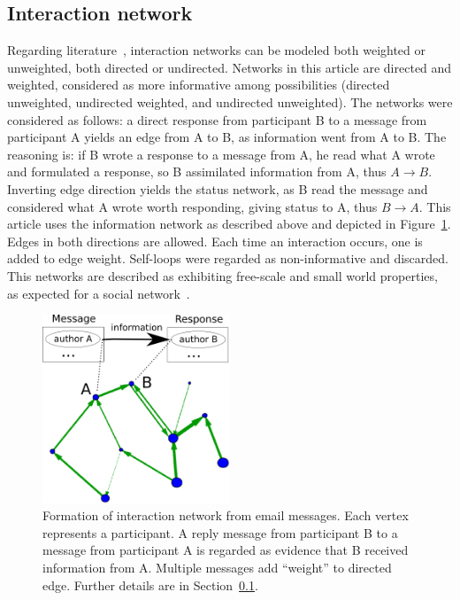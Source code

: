 \documentclass[%
 aip,
 jmp,%
 amsmath,amssymb,
 reprint,%
]{revtex4-1}
\begin{document}
    \subsection{Interaction network}\label{intNet}
Regarding literature~\cite{bird,newmanCommunityDirected,newmanCommunity2013}, interaction networks can be modeled both weighted or unweighted, both directed or undirected. Networks in this article are directed and weighted, considered as more informative among possibilities (directed unweighted, undirected weighted, and undirected unweighted).
The networks were considered as follows: a direct response from participant B to a message from participant A yields an edge from A to B, as information went from A to B. The reasoning is: if B wrote a response to a message from A, he read what A wrote and formulated a response, so B assimilated information from A, thus $A \rightarrow B$. Inverting edge direction yields the status network, as B read the message and considered what A wrote worth responding, giving status to A, thus $B\rightarrow A$. This article uses the information network as described above and depicted in Figure~\ref{formationNetwork}. Edges in both directions are allowed. Each time an interaction occurs, one is added to edge weight. Self-loops were regarded as non-informative and discarded. This networks are described as exhibiting free-scale and small world properties, as expected for a social network~\cite{bird}.

\begin{figure}[hb]
    \centering
    \includegraphics[width=0.5\textwidth]{figs/criaRede_}
    \caption{Formation of interaction network from email messages. Each vertex represents a participant. A reply message from participant B to a message from participant A is regarded as evidence that B received information from A. Multiple messages add ``weight'' to directed edge. Further details are in Section~\ref{intNet}.}
    \label{formationNetwork}
\end{figure}
\end{document}
